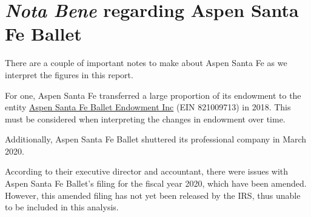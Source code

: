 \documentclass[Dance Data
Project,article,submit,moreauthors,pdftex]{mdpi}
\begin{document}
\hypertarget{asfb}{%
\section{\texorpdfstring{\emph{Nota Bene} regarding Aspen Santa Fe
Ballet}{Nota Bene regarding Aspen Santa Fe Ballet}}\label{asfb}}

\label{sec:asfb}

There are a couple of important notes to make about Aspen Santa Fe as we
interpret the figures in this report.

For one, Aspen Santa Fe transferred a large proportion of its endowment
to the entity
\href{https://projects.propublica.org/nonprofits/organizations/821009713}{Aspen
Santa Fe Ballet Endowment Inc} (EIN 821009713) in 2018. This must be
considered when interpreting the changes in endowment over time.

Additionally, Aspen Santa Fe Ballet shuttered its professional company
in March 2020.

According to their executive director and accountant, there were issues
with Aspen Santa Fe Ballet's filing for the fiscal year 2020, which have
been amended. However, this amended filing has not yet been released by
the IRS, thus unable to be included in this analysis.
\end{document}
